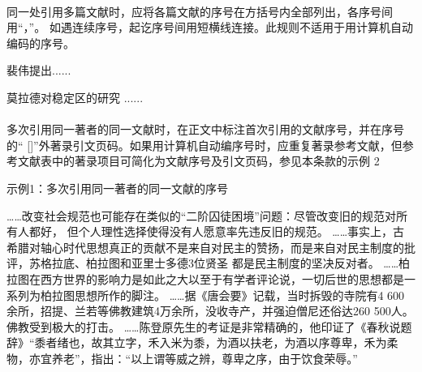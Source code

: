 \documentclass{article}
\begin{document}
\paragraph{} 同一处引用多篇文献时，应将各篇文献的序号在方括号内全部列出，各序号间用“，”。
如遇连续序号，起讫序号间用短横线连接。此规则不适用于用计算机自动编码的序号。


\begin{refsection}

裴伟提出\cite{Humphrey1971--,KENNEDY1975-311-386}......

莫拉德对稳定区的研究
\cite{CRANE1972--,Weinstein1974-745-772,KENNEDY1975-311-386}......


\end{refsection}


\paragraph{} 多次引用同一著者的同一文献时，在正文中标注首次引用的文献序号，并在序号的“ []”外著录引文页码。如果用计算机自动编序号时，应重复著录参考文献，但参考文献表中的著录项目可简化为文献序号及引文页码，参见本条款的示例 2

\begin{refsection}
示例1：多次引用同一著者的同一文献的序号

……改变社会规范也可能存在类似的“二阶囚徒困境”问题：尽管改变旧的规范对所有人都好，
但个人理性选择使得没有人愿意率先违反旧的规范\cite{Sunstein1996-903-903}。
……事实上，古希腊对轴心时代思想真正的贡献不是来自对民主的赞扬，而是来自对民主制度的批评，苏格拉底、柏拉图和亚里士多德3位贤圣
都是民主制度的坚决反对者。
……柏拉图在西方世界的影响力是如此之大以至于有学者评论说，一切后世的思想都是一系列为柏拉图思想所作的脚注\cite{罗杰斯2011-15-16}。
……据《唐会要》记载，当时拆毁的寺院有4 600余所，招提、兰若等佛教建筑4万余所，没收寺产，并强迫僧尼还俗达260 500人。
佛教受到极大的打击。
……陈登原先生的考证是非常精确的，他印证了《春秋说题辞》“黍者绪也，故其立字，禾入米为黍，为酒以扶老，为酒以序尊卑，禾为柔物，亦宜养老”，指出：“以上谓等威之辨，尊卑之序，由于饮食荣辱。”\cite{陈登原2000-29-29}

\printbibliography[heading=subbibliography,title={参考文献：}]
\end{refsection}
\end{document}
